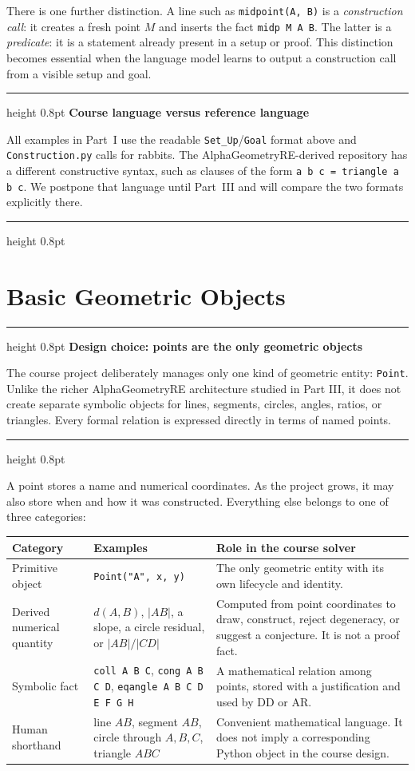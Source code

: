 \documentclass[reqno]{amsart}
\newenvironment{lecturebox}[1]{%
    \par\medskip
    \noindent\begingroup
    \setlength{\parindent}{0pt}
    \color{agblue}\hrule height 0.8pt\color{black}
    \smallskip
    \textbf{\color{agblue}#1}\par\smallskip
}{%
    \smallskip
    \color{agblue}\hrule height 0.8pt\color{black}
    \endgroup
    \medskip
}
\DeclareMathOperator{\1}{\textbf{1}}
\begin{document}
There is one further distinction. A line such as
\verb|midpoint(A, B)| is a \emph{construction call}: it creates a fresh point
$M$ and inserts the fact \verb|midp M A B|. The latter is a
\emph{predicate}: it is a statement already present in a setup or proof. This
distinction becomes essential when the language model learns to output a
construction call from a visible setup and goal.

\begin{lecturebox}{Course language versus reference language}
All examples in Part~I use the readable \verb|Set_Up|/\verb|Goal| format above
and \texttt{Construction.py} calls for rabbits. The AlphaGeometryRE-derived
repository has a different constructive syntax, such as clauses of the form
\verb|a b c = triangle a b c|. We postpone that language until Part~III and
will compare the two formats explicitly there.
\end{lecturebox}

\section{Basic Geometric Objects}\label{sec: Basic Geometric Objects}

\begin{lecturebox}{Design choice: points are the only geometric objects}
The course project deliberately manages only one kind of geometric entity:
\texttt{Point}. Unlike the richer AlphaGeometryRE architecture studied in
Part III, it does not create separate symbolic objects for lines, segments,
circles, angles, ratios, or triangles. Every formal relation is expressed
directly in terms of named points.
\end{lecturebox}

A point stores a name and numerical coordinates. As the project grows, it may
also store when and how it was constructed. Everything else belongs to one of
three categories:

\begin{center}
\begin{tabular}{p{}p{}p{}}
\textbf{Category} & \textbf{Examples} & \textbf{Role in the course solver} \\
\hline
Primitive object & \verb|Point("A", x, y)| & The only geometric entity with
its own lifecycle and identity. \\
Derived numerical quantity & $d(A,B)$, $|AB|$, a slope, a circle residual, or
$|AB|/|CD|$ & Computed from point coordinates to draw, construct, reject
degeneracy, or suggest a conjecture. It is not a proof fact. \\
Symbolic fact & \verb|coll A B C|, \verb|cong A B C D|,
\verb|eqangle A B C D E F G H| & A mathematical relation among points,
stored with a justification and used by DD or AR. \\
Human shorthand & line $AB$, segment $AB$, circle through $A,B,C$, triangle
$ABC$ & Convenient mathematical language. It does not imply a corresponding
Python object in the course design. \\
\end{tabular}
\end{center}
\end{document}
